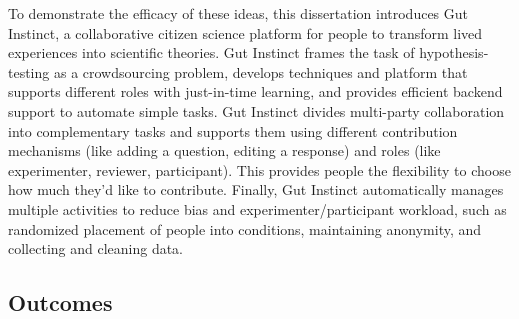 To demonstrate the efficacy of these ideas, this dissertation introduces Gut Instinct, a collaborative citizen science platform for people to transform lived experiences into scientific theories. Gut Instinct frames the task of hypothesis-testing as a crowdsourcing problem, develops techniques and platform that supports different roles with just-in-time learning, and provides efficient backend support to automate simple tasks. Gut Instinct divides multi-party collaboration into complementary tasks and supports them using different contribution mechanisms (like adding a question, editing a response) and roles (like experimenter, reviewer, participant). This provides people the flexibility to choose how much they’d like to contribute. Finally, Gut Instinct automatically manages multiple activities to reduce 
bias and experimenter/participant workload, such as randomized placement of  people into conditions, maintaining anonymity, and collecting and cleaning data.


\subsection{Outcomes}


